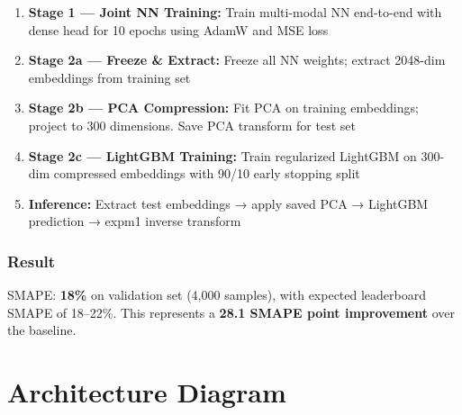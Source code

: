 \documentclass[conference]{IEEEtran}
\begin{document}
\begin{enumerate}
    \item \textbf{Stage 1 — Joint NN Training:} Train multi-modal NN end-to-end with dense head for 10 epochs using AdamW and MSE loss
    \item \textbf{Stage 2a — Freeze \& Extract:} Freeze all NN weights; extract 2048-dim embeddings from training set
    \item \textbf{Stage 2b — PCA Compression:} Fit PCA on training embeddings; project to 300 dimensions. Save PCA transform for test set
    \item \textbf{Stage 2c — LightGBM Training:} Train regularized LightGBM on 300-dim compressed embeddings with 90/10 early stopping split
    \item \textbf{Inference:} Extract test embeddings → apply saved PCA → LightGBM prediction → expm1 inverse transform
\end{enumerate}

\subsubsection{Result}
SMAPE: \textbf{18\%} on validation set (4,000 samples), with expected leaderboard SMAPE of 18--22\%. This represents a \textbf{28.1 SMAPE point improvement} over the baseline.

\section{Architecture Diagram}
\end{document}
